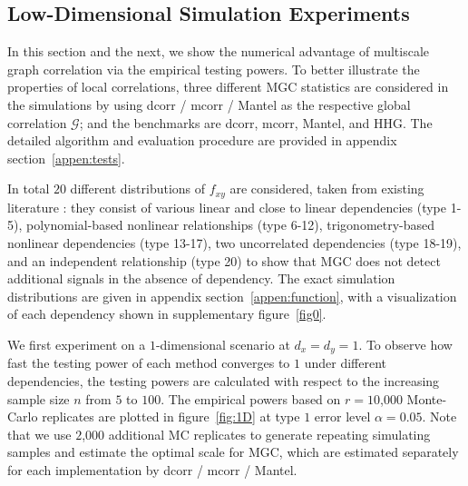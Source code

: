 \documentclass[11pt]{article}
\newcommand{\G}{\mathcal{G}}
\begin{document}
\subsection{Low-Dimensional Simulation Experiments}
\label{numer1}
In this section and the next, we show the numerical advantage of multiscale graph correlation via the empirical testing powers. To better illustrate the properties of local correlations, three different MGC statistics are considered in the simulations by using dcorr / mcorr / Mantel as the respective global correlation $\G$; and the benchmarks are dcorr, mcorr, Mantel, and HHG. The detailed algorithm and evaluation procedure are provided in appendix section~\ref{appen:tests}.

In total $20$ different distributions of $f_{xy}$ are considered, taken from existing literature \cite{SzekelyRizzoBakirov2007, SimonTibshirani2012, GorfineHellerHeller2012, HellerGorfine2013}: they consist of various linear and close to linear dependencies (type 1-5), polynomial-based nonlinear relationships (type 6-12), trigonometry-based nonlinear dependencies (type 13-17), two uncorrelated dependencies (type 18-19), and an independent relationship (type 20) to show that MGC does not detect additional signals in the absence of dependency. The exact simulation distributions are given in appendix section~\ref{appen:function}, with a visualization of each dependency shown in supplementary figure~\ref{fig0}.

We first experiment on a $1$-dimensional scenario at $d_{x}=d_{y}=1$. To observe how fast the testing power of each method converges to $1$ under different dependencies, the testing powers are calculated with respect to the increasing sample size $n$ from $5$ to $100$. The empirical powers based on $r=10$,$000$ Monte-Carlo replicates are plotted in figure~\ref{fig:1D} at type $1$ error level $\alpha=0.05$. Note that we use $2$,$000$ additional MC replicates to generate repeating simulating samples and estimate the optimal scale for MGC, which are estimated separately for each implementation by dcorr / mcorr / Mantel.
\end{document}
